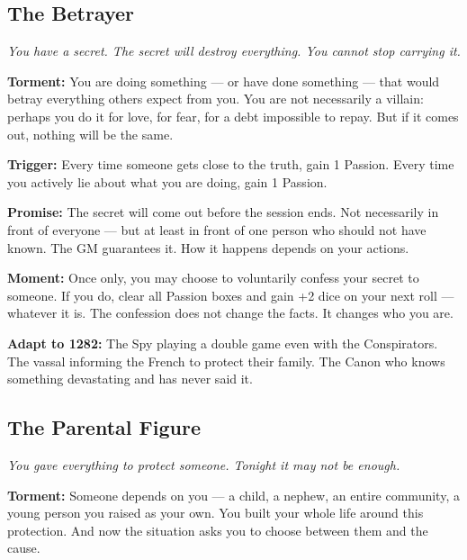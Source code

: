 
\filetto

\subsection{The Betrayer}
\textit{You have a secret. The secret will destroy everything. You cannot stop carrying it.}

\textbf{Torment:} You are doing something --- or have done something ---
that would betray everything others expect from you. You are not
necessarily a villain: perhaps you do it for love, for fear, for a debt
impossible to repay. But if it comes out, nothing will be the same.

\textbf{Trigger:} Every time someone gets close to the truth, gain 1
Passion. Every time you actively lie about what you are doing, gain
1 Passion.

\textbf{Promise:} The secret will come out before the session ends.
Not necessarily in front of everyone --- but at least in front of one
person who should not have known. The GM guarantees it. How it happens
depends on your actions.

\textbf{Moment:} Once only, you may choose to voluntarily confess your
secret to someone. If you do, clear all Passion boxes and gain +2 dice
on your next roll --- whatever it is. The confession does not change
the facts. It changes who you are.

\textbf{Adapt to 1282:} The Spy playing a double game even with the
Conspirators. The vassal informing the French to protect their family.
The Canon who knows something devastating and has never said it.

\filetto

\subsection{The Parental Figure}
\textit{You gave everything to protect someone. Tonight it may not be enough.}

\textbf{Torment:} Someone depends on you --- a child, a nephew, an entire
community, a young person you raised as your own. You built your whole
life around this protection. And now the situation asks you to choose
between them and the cause.

